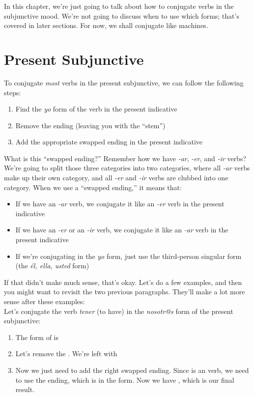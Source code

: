 In this chapter, we're just going to talk about how to conjugate verbs in the subjunctive mood. We're not going to discuss when to use which forms; that's covered in later sections. For now, we shall conjugate like machines. \\

\section{Present Subjunctive}
To conjugate \textit{most} verbs in the present subjunctive, we can follow the following steps:
\begin{enumerate}[noitemsep]
	\item Find the \textit{yo} form of the verb in the present indicative
	\item Remove the  ending (leaving you with the ``stem'')
	\item Add the appropriate swapped ending in the present indicative
\end{enumerate}

What is this ``swapped ending?'' Remember how we have \textit{-ar}, \textit{-er}, and \textit{-ir} verbs? We're going to split those three categories into two categories, where all \textit{-ar} verbs make up their own category, and all \textit{-er} and \textit{-ir} verbs are clubbed into one category. When we use a ``swapped ending,'' it means that:
\begin{itemize}[noitemsep]
	\item If we have an \textit{-ar} verb, we conjugate it like an \textit{-er} verb in the present indicative
	\item If we have an \textit{-er} or an \textit{-ir} verb, we conjugate it like an \textit{-ar} verb in the present indicative
	\item If we're conjugating in the \textit{yo} form, just use the third-person singular form (the \textit{{\'{e}l, ella, usted}} form)
\end{itemize}

If that didn't make much sense, that's okay. Let's do a few examples, and then you might want to revisit the two previous paragraphs. They'll make a lot more sense after these examples: \\

Let's conjugate the verb \textit{tener} (to have) in the \textit{nosotr@s} form of the present subjunctive:
\begin{enumerate}[noitemsep]
	\item The  form of  is 
	\item Let's remove the . We're left with 
	\item Now we just need to add the right swapped ending. Since  is an  verb, we need to use the  ending, which is  in the  form. Now we have , which is our final result. 
\end{enumerate}

